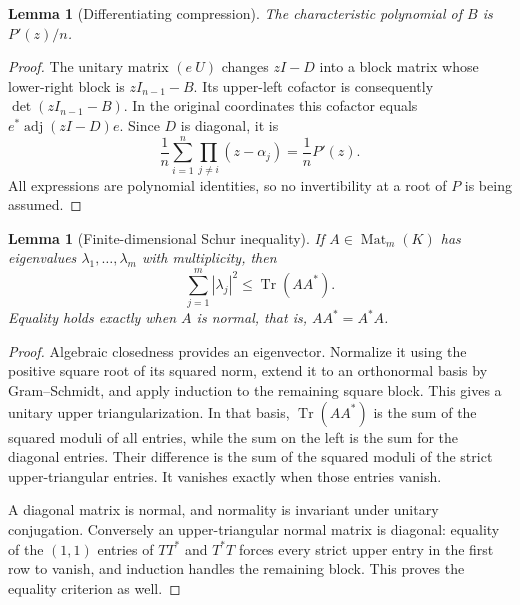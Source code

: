 \documentclass[11pt,letterpaper]{article}
\numberwithin{equation}{section}
\newtheorem{lemma}[theorem]{Lemma}
\theoremstyle{definition}
\theoremstyle{remark}\newtheorem{remark}[theorem]{Remark}
\newcommand{\Tr}{\operatorname{Tr}}
\begin{document}
\begin{lemma}[Differentiating compression]\label{lem:compression}
The characteristic polynomial of $B$ is $P'(z)/n$.
\end{lemma}
\begin{proof}
The unitary matrix $(e\ U)$ changes $zI-D$ into a block matrix whose
lower-right block is $zI_{n-1}-B$. Its upper-left cofactor is consequently
$\det(zI_{n-1}-B)$. In the original coordinates this cofactor equals
$e^*\operatorname{adj}(zI-D)e$. Since $D$ is diagonal, it is
\[
 \frac1n\sum_{i=1}^n\prod_{j\ne i}(z-\alpha_j)=\frac1nP'(z).
\]
All expressions are polynomial identities, so no invertibility at a root
of $P$ is being assumed.
\end{proof}

\begin{lemma}[Finite-dimensional Schur inequality]\label{lem:schur}
If $A\in\operatorname{Mat}_m(K)$ has eigenvalues $\lambda_1,\ldots,\lambda_m$
with multiplicity, then
\[
 \sum_{j=1}^m|\lambda_j|^2\le\Tr(AA^*).
\]
Equality holds exactly when $A$ is normal, that is, $AA^*=A^*A$.
\end{lemma}
\begin{proof}
Algebraic closedness provides an eigenvector. Normalize it using the
positive square root of its squared norm, extend it to an orthonormal
basis by Gram--Schmidt, and apply induction to the remaining square
block. This gives a unitary upper triangularization. In that basis,
$\Tr(AA^*)$ is the sum of the squared moduli of all entries, while the
sum on the left is the sum for the diagonal entries. Their difference
is the sum of the squared moduli of the strict upper-triangular entries.
It vanishes exactly when those entries vanish.

A diagonal matrix is normal, and normality is invariant under unitary
conjugation. Conversely an upper-triangular normal matrix is diagonal:
equality of the $(1,1)$ entries of $TT^*$ and $T^*T$ forces every
strict upper entry in the first row to vanish, and induction handles
the remaining block. This proves the equality criterion as well.
\end{proof}
\end{document}
